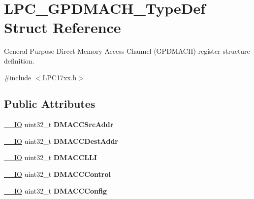 \hypertarget{struct_l_p_c___g_p_d_m_a_c_h___type_def}{\section{\-L\-P\-C\-\_\-\-G\-P\-D\-M\-A\-C\-H\-\_\-\-Type\-Def \-Struct \-Reference}
\label{struct_l_p_c___g_p_d_m_a_c_h___type_def}
}


\-General \-Purpose \-Direct \-Memory \-Access \-Channel (\-G\-P\-D\-M\-A\-C\-H) register structure definition.  




{\ttfamily \#include $<$\-L\-P\-C17xx.\-h$>$}

\subsection*{\-Public \-Attributes}
\begin{DoxyCompactItemize}
\item 
\hypertarget{struct_l_p_c___g_p_d_m_a_c_h___type_def_a6b0842b5ab5e43501d684f874cd5ad79}{\hyperlink{group___c_m_s_i_s__core__definitions_gaec43007d9998a0a0e01faede4133d6be}{\-\_\-\-\_\-\-I\-O} uint32\-\_\-t {\bfseries \-D\-M\-A\-C\-C\-Src\-Addr}}\label{struct_l_p_c___g_p_d_m_a_c_h___type_def_a6b0842b5ab5e43501d684f874cd5ad79}

\item 
\hypertarget{struct_l_p_c___g_p_d_m_a_c_h___type_def_aba94af16ce1285f05c7045f29987fd30}{\hyperlink{group___c_m_s_i_s__core__definitions_gaec43007d9998a0a0e01faede4133d6be}{\-\_\-\-\_\-\-I\-O} uint32\-\_\-t {\bfseries \-D\-M\-A\-C\-C\-Dest\-Addr}}\label{struct_l_p_c___g_p_d_m_a_c_h___type_def_aba94af16ce1285f05c7045f29987fd30}

\item 
\hypertarget{struct_l_p_c___g_p_d_m_a_c_h___type_def_abeb9b41622d5ef0b5be547eddae122ff}{\hyperlink{group___c_m_s_i_s__core__definitions_gaec43007d9998a0a0e01faede4133d6be}{\-\_\-\-\_\-\-I\-O} uint32\-\_\-t {\bfseries \-D\-M\-A\-C\-C\-L\-L\-I}}\label{struct_l_p_c___g_p_d_m_a_c_h___type_def_abeb9b41622d5ef0b5be547eddae122ff}

\item 
\hypertarget{struct_l_p_c___g_p_d_m_a_c_h___type_def_a419bf2ba47ac187f8ba16b2294675783}{\hyperlink{group___c_m_s_i_s__core__definitions_gaec43007d9998a0a0e01faede4133d6be}{\-\_\-\-\_\-\-I\-O} uint32\-\_\-t {\bfseries \-D\-M\-A\-C\-C\-Control}}\label{struct_l_p_c___g_p_d_m_a_c_h___type_def_a419bf2ba47ac187f8ba16b2294675783}

\item 
\hypertarget{struct_l_p_c___g_p_d_m_a_c_h___type_def_a6775b0feebee7bb90a05bb649c331c9d}{\hyperlink{group___c_m_s_i_s__core__definitions_gaec43007d9998a0a0e01faede4133d6be}{\-\_\-\-\_\-\-I\-O} uint32\-\_\-t {\bfseries \-D\-M\-A\-C\-C\-Config}}\label{struct_l_p_c___g_p_d_m_a_c_h___type_def_a6775b0feebee7bb90a05bb649c331c9d}

\end{DoxyCompactItemize}


